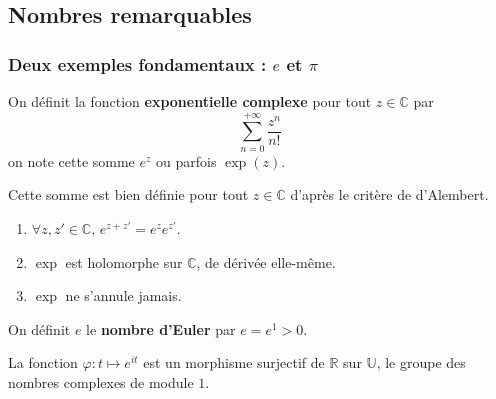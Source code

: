 




  \subsection{Nombres remarquables}

  \subsubsection{Deux exemples fondamentaux : \texorpdfstring{$e$}{e} et \texorpdfstring{$\pi$}{π}}


  \begin{definition}
    On définit la fonction \textbf{exponentielle complexe} pour tout $z \in \mathbb{C}$ par
    \[ \sum_{n=0}^{+\infty} \frac{z^n}{n!} \]
    on note cette somme $e^z$ ou parfois $\exp(z)$.
  \end{definition}

  \begin{remark}
    Cette somme est bien définie pour tout $z \in \mathbb{C}$ d'après le critère de d'Alembert.
  \end{remark}

  \begin{proposition}
    \begin{enumerate}[label=(\roman*)]
      \item $\forall z, z' \in \mathbb{C}, \, e^{z+z'} = e^z e^{z'}$.
      \item $\exp$ est holomorphe sur $\mathbb{C}$, de dérivée elle-même.
      \item $\exp$ ne s'annule jamais.
    \end{enumerate}
  \end{proposition}


  \begin{definition}
    On définit $e$ le \textbf{nombre d'Euler} par $e = e^1 > 0$.
  \end{definition}


  \begin{proposition}
    La fonction $\varphi : t \mapsto e^{it}$ est un morphisme surjectif de $\mathbb{R}$ sur $\mathbb{U}$, le groupe des nombres complexes de module $1$.
  \end{proposition}

